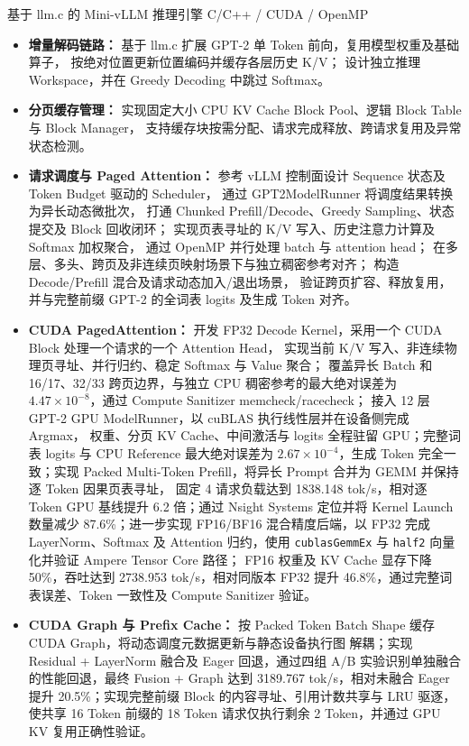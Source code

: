\projectHeading
{基于 llm.c 的 Mini-vLLM 推理引擎}
{C/C++ / CUDA / OpenMP}

\begin{itemize}
    \item \textbf{增量解码链路：}
    基于 llm.c 扩展 GPT-2 单 Token 前向，复用模型权重及基础算子，
    按绝对位置更新位置编码并缓存各层历史 K/V；
    设计独立推理 Workspace，并在 Greedy Decoding 中跳过 Softmax。

    \item \textbf{分页缓存管理：}
    实现固定大小 CPU KV Cache Block Pool、逻辑 Block Table 与 Block Manager，
    支持缓存块按需分配、请求完成释放、跨请求复用及异常状态检测。

    \item \textbf{请求调度与 Paged Attention：}
    参考 vLLM 控制面设计 Sequence 状态及 Token Budget 驱动的 Scheduler，
    通过 GPT2ModelRunner 将调度结果转换为异长动态微批次，
    打通 Chunked Prefill/Decode、Greedy Sampling、状态提交及 Block 回收闭环；
    实现页表寻址的 K/V 写入、历史注意力计算及 Softmax 加权聚合，
    通过 OpenMP 并行处理 batch 与 attention head；
    在多层、多头、跨页及非连续页映射场景下与独立稠密参考对齐；
    构造 Decode/Prefill 混合及请求动态加入/退出场景，
    验证跨页扩容、释放复用，并与完整前缀 GPT-2 的全词表 logits 及生成 Token 对齐。

    \item \textbf{CUDA PagedAttention：}
    开发 FP32 Decode Kernel，采用一个 CUDA Block 处理一个请求的一个 Attention Head，
    实现当前 K/V 写入、非连续物理页寻址、并行归约、稳定 Softmax 与 Value 聚合；
    覆盖异长 Batch 和 16/17、32/33 跨页边界，与独立 CPU 稠密参考的最大绝对误差为
    $4.47\times10^{-8}$，通过 Compute Sanitizer memcheck/racecheck；
    接入 12 层 GPT-2 GPU ModelRunner，以 cuBLAS 执行线性层并在设备侧完成 Argmax，
    权重、分页 KV Cache、中间激活与 logits 全程驻留 GPU；完整词表 logits 与 CPU
    Reference 最大绝对误差为 $2.67\times10^{-4}$，生成 Token 完全一致；实现 Packed
    Multi-Token Prefill，将异长 Prompt 合并为 GEMM 并保持逐 Token 因果页表寻址，
    固定 4 请求负载达到 1838.148 tok/s，相对逐 Token GPU 基线提升 6.2 倍；通过
    Nsight Systems 定位并将 Kernel Launch 数量减少 87.6\%；进一步实现 FP16/BF16
    混合精度后端，以 FP32 完成 LayerNorm、Softmax 及 Attention 归约，使用
    \texttt{cublasGemmEx} 与 \texttt{half2} 向量化并验证 Ampere Tensor Core 路径；
    FP16 权重及 KV Cache 显存下降 50\%，吞吐达到 2738.953 tok/s，相对同版本 FP32
    提升 46.8\%，通过完整词表误差、Token 一致性及 Compute Sanitizer 验证。

    \item \textbf{CUDA Graph 与 Prefix Cache：}
    按 Packed Token Batch Shape 缓存 CUDA Graph，将动态调度元数据更新与静态设备执行图
    解耦；实现 Residual + LayerNorm 融合及 Eager 回退，通过四组 A/B 实验识别单独融合
    的性能回退，最终 Fusion + Graph 达到 3189.767 tok/s，相对未融合 Eager 提升
    20.5\%；实现完整前缀 Block 的内容寻址、引用计数共享与 LRU 驱逐，使共享 16 Token
    前缀的 18 Token 请求仅执行剩余 2 Token，并通过 GPU KV 复用正确性验证。
\end{itemize}
